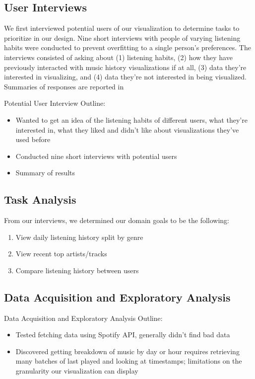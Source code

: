 \documentclass[journal]{vgtc}                %
\begin{document}
\subsection{User Interviews}

We first interviewed potential users of our visualization to determine tasks to prioritize in our design. Nine short interviews with people of varying listening habits were conducted to prevent overfitting to a single person's preferences. The interviews consisted of asking about (1) listening habits, (2) how they have previously interacted with music history visualizations if at all, (3) data they're interested in visualizing, and (4) data they're not interested in being visualized. Summaries of responses are reported in %

Potential User Interview Outline:
\begin{itemize}
  \item Wanted to get an idea of the listening habits of different users, what they're interested in, what they liked and didn't like about visualizations they've used before
  \item Conducted nine short interviews with potential users
  \item Summary of results
\end{itemize}

\subsection{Task Analysis}

From our interviews, we determined our domain goals to be the following:
\begin{enumerate}
  \item View daily listening history split by genre
  \item View recent top artists/tracks
  \item Compare listening history between users
\end{enumerate}


\subsection{Data Acquisition and Exploratory Analysis}
Data Acquisition and Exploratory Analysis Outline:
\begin{itemize}
  \item Tested fetching data using Spotify API, generally didn't find bad data
  \item Discovered getting breakdown of music by day or hour requires retrieving many batches of last played and looking at timestamps; limitations on the granularity our visualization can display
\end{itemize}
\end{document}
